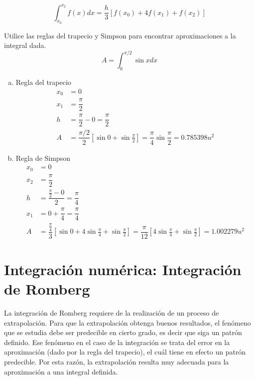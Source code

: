 \begin{definitionT}
	\begin{equation}
		\int_{x_0}^{x_2} f(x)dx = \dfrac{h}{3}\left[f(x_0) + 4f(x_1) + f(x_2)\right]
		\label{eq:reglaSimpson}
	  \end{equation}
\end{definitionT}

\begin{exerciseT}
	Utilice las reglas del trapecio y Simpson para encontrar aproximaciones a la integral dada.
	\[ A = \int_0^{\pi/2} \sin xdx\]
	\begin{enumerate}[a)]
		\item Regla del trapecio
			\begin{align*}
				x_0 &= 0\\
				x_1 &= \dfrac{\pi}{2}\\
				h &= \dfrac{\pi}{2}-0 = \dfrac{\pi}{2}\\
				A &= \dfrac{\pi/2}{2}\left[\sin 0 + \sin\frac{\pi}{2}\right] = \dfrac{\pi}{4}\sin\dfrac{\pi}{2} = 0.785398 u^2
			\end{align*}
		\item Regla de Simpson
			\begin{align*}
				x_0 &= 0 \\
				x_2 &= \dfrac{\pi}{2}\\
				h &= \dfrac{\frac{\pi}{2}-0}{2} = \dfrac{\pi}{4}\\
				x_1 &= 0 + \dfrac{\pi}{4} = \dfrac{\pi}{4}\\
				A &= \dfrac{\frac{\pi}{4}}{3}\left[\sin 0 + 4\sin \frac{\pi}{4} + \sin \frac{\pi}{2} \right] 
					= \dfrac{\pi}{12}\left[4\sin \frac{\pi}{4} + \sin \frac{\pi}{2} \right] = 1.002279 u^2
			\end{align*}
	\end{enumerate}
\end{exerciseT}

\section{Integración numérica: Integración de Romberg}
La integración de Romberg requiere de la realización de un proceso de extrapolación. Para que la extrapolación obtenga  
buenos resultados, el fenómeno que se estudia debe ser predecible en cierto grado, es decir que siga un patrón definido. 
Ese fenómeno en el caso de la integración se trata del error en la aproximación (dado por la regla del trapecio), el cuál tiene en 
efecto un patrón predecible. Por esta razón, la extrapolación resulta muy adecuada para la aproximación a una integral definida.

